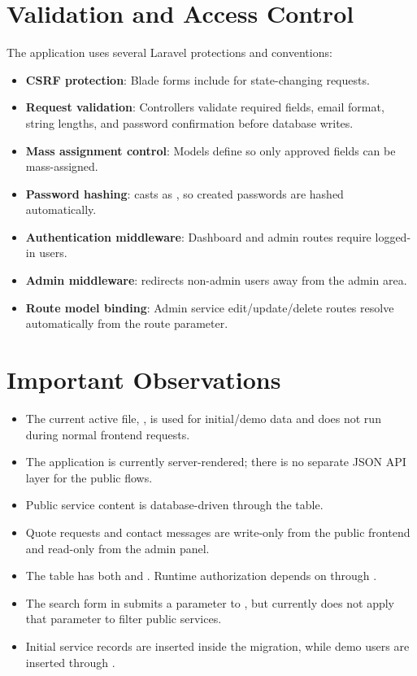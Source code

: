 \documentclass[11pt,a4paper]{article}
\begin{document}
\section{Validation and Access Control}

The application uses several Laravel protections and conventions:

\begin{itemize}
    \item \textbf{CSRF protection}: Blade forms include  for state-changing requests.
    \item \textbf{Request validation}: Controllers validate required fields, email format, string lengths, and password confirmation before database writes.
    \item \textbf{Mass assignment control}: Models define  so only approved fields can be mass-assigned.
    \item \textbf{Password hashing}:  casts  as , so created passwords are hashed automatically.
    \item \textbf{Authentication middleware}: Dashboard and admin routes require logged-in users.
    \item \textbf{Admin middleware}:  redirects non-admin users away from the admin area.
    \item \textbf{Route model binding}: Admin service edit/update/delete routes resolve  automatically from the route parameter.
\end{itemize}

\section{Important Observations}

\begin{itemize}
    \item The current active file, , is used for initial/demo data and does not run during normal frontend requests.
    \item The application is currently server-rendered; there is no separate JSON API layer for the public flows.
    \item Public service content is database-driven through the  table.
    \item Quote requests and contact messages are write-only from the public frontend and read-only from the admin panel.
    \item The  table has both  and . Runtime authorization depends on  through .
    \item The search form in  submits a  parameter to , but  currently does not apply that parameter to filter public services.
    \item Initial service records are inserted inside the  migration, while demo users are inserted through .
\end{itemize}
\end{document}
